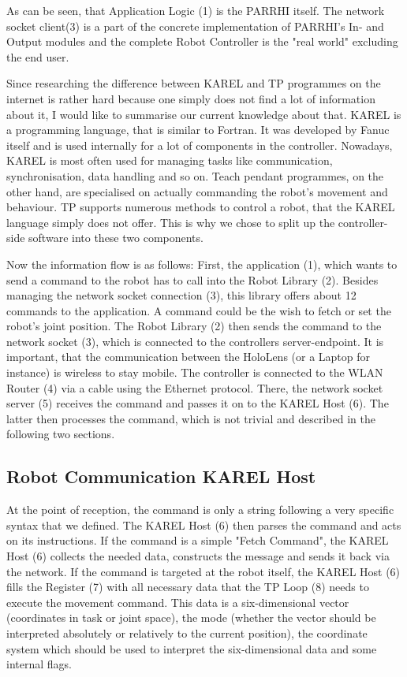 As can be seen, that Application Logic (1) is the PARRHI itself. The network socket client(3) is a part of the concrete implementation of PARRHI's In- and Output modules and the complete Robot Controller is the "real world" excluding the end user.


Since researching the difference between KAREL and TP programmes on the internet is rather hard because one simply does not find a lot of information about it, I would like to summarise our current knowledge about that. KAREL is a programming language, that is similar to Fortran. It was developed by Fanuc itself and is used internally for a lot of components in the controller. Nowadays, KAREL is most often used for managing tasks like communication, synchronisation, data handling and so on. Teach pendant programmes, on the other hand, are specialised on actually commanding the robot's movement and behaviour. TP supports numerous methods to control a robot, that the KAREL language simply does not offer. This is why we chose to split up the controller-side software into these two components.


Now the information flow is as follows: First, the application (1), which wants to send a command to the robot has to call into the Robot Library (2). Besides managing the network socket connection (3), this library offers about 12 commands to the application. A command could be the wish to fetch or set the robot's joint position. The Robot Library (2) then sends the command to the network socket (3), which is connected to the controllers server-endpoint. It is important, that the communication between the HoloLens (or a Laptop for instance) is wireless to stay mobile. The controller is connected to the WLAN Router (4) via a cable using the Ethernet protocol. There, the network socket server (5) receives the command and passes it on to the KAREL Host (6). The latter then processes the command, which is not trivial and described in the following two sections.

\subsection{Robot Communication KAREL Host}

At the point of reception, the command is only a string following a very specific syntax that we defined. The KAREL Host (6) then parses the command and acts on its instructions. If the command is a simple "Fetch Command", the KAREL Host (6) collects the needed data, constructs the message and sends it back via the network. If the command is targeted at the robot itself, the KAREL Host (6) fills the Register (7) with all necessary data that the TP Loop (8) needs to execute the movement command. This data is a six-dimensional vector (coordinates in task or joint space), the mode (whether the vector should be interpreted absolutely or relatively to the current position), the coordinate system which should be used to interpret the six-dimensional data and some internal flags.

